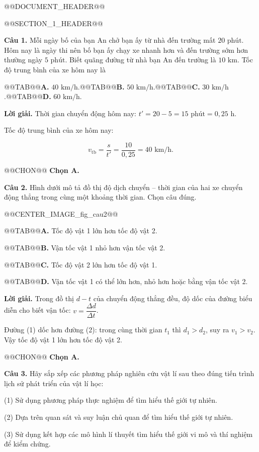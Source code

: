 \documentclass{article}
\begin{document}
@@DOCUMENT_HEADER@@

@@SECTION_1_HEADER@@

\textbf{Câu 1.} Mỗi ngày bố của bạn An chở bạn ấy từ nhà đến trường mất $20\text{ phút}$. Hôm nay là ngày thi nên bố bạn ấy chạy xe nhanh hơn và đến trường sớm hơn thường ngày $5\text{ phút}$. Biết quãng đường từ nhà bạn An đến trường là $10\text{ km}$. Tốc độ trung bình của xe hôm nay là

@@TAB@@\textbf{A.} $40\text{ km/h}$.@@TAB@@\textbf{B.} $50\text{ km/h}$.@@TAB@@\textbf{C.} $30\text{ km/h}$.@@TAB@@\textbf{D.} $60\text{ km/h}$.

\textbf{Lời giải.} Thời gian chuyển động hôm nay: $t' = 20 - 5 = 15\text{ phút} = 0{,}25\text{ h}$.

Tốc độ trung bình của xe hôm nay:

\[v_{\text{tb}} = \frac{s}{t'} = \frac{10}{0{,}25} = 40\text{ km/h}.\]

@@CHON@@ \textbf{Chọn A.}

\textbf{Câu 2.} Hình dưới mô tả đồ thị độ dịch chuyển -- thời gian của hai xe chuyển động thẳng trong cùng một khoảng thời gian. Chọn câu đúng.

@@CENTER_IMAGE_fig_cau2@@

@@TAB@@\textbf{A.} Tốc độ vật 1 lớn hơn tốc độ vật 2.

@@TAB@@\textbf{B.} Vận tốc vật 1 nhỏ hơn vận tốc vật 2.

@@TAB@@\textbf{C.} Tốc độ vật 2 lớn hơn tốc độ vật 1.

@@TAB@@\textbf{D.} Vận tốc vật 1 có thể lớn hơn, nhỏ hơn hoặc bằng vận tốc vật 2.

\textbf{Lời giải.} Trong đồ thị $d - t$ của chuyển động thẳng đều, độ dốc của đường biểu diễn cho biết vận tốc: $v = \dfrac{\Delta d}{\Delta t}$.

Đường (1) dốc hơn đường (2): trong cùng thời gian $t_1$ thì $d_1 > d_2$, suy ra $v_1 > v_2$. Vậy tốc độ vật 1 lớn hơn tốc độ vật 2.

@@CHON@@ \textbf{Chọn A.}

\textbf{Câu 3.} Hãy sắp xếp các phương pháp nghiên cứu vật lí sau theo đúng tiến trình lịch sử phát triển của vật lí học:

 (1) Sử dụng phương pháp thực nghiệm để tìm hiểu thế giới tự nhiên.

 (2) Dựa trên quan sát và suy luận chủ quan để tìm hiểu thế giới tự nhiên.

 (3) Sử dụng kết hợp các mô hình lí thuyết tìm hiểu thế giới vi mô và thí nghiệm để kiểm chứng.
\end{document}
